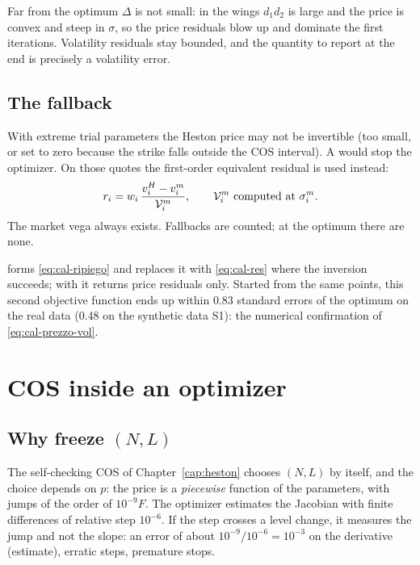 \begin{perche}[title={Why volatilities, then}]
Far from the optimum $\Delta$ is not small: in the wings $d_1d_2$ is large and the price is convex and steep in
$\sigma$, so the price residuals blow up and dominate the first iterations. Volatility residuals stay bounded, and the
quantity to report at the end is precisely a volatility error.
\end{perche}

\subsection{The fallback}
With extreme trial parameters the Heston price may not be invertible (too small, or set to zero because the strike
falls outside the COS interval). A  would stop the optimizer. On those quotes the first-order equivalent
residual is used instead:
\begin{equation}\label{eq:cal-ripiego}
r_i=w_i\,\frac{v^H_i-v^m_i}{\mathcal{V}^m_i},\qquad \mathcal{V}^m_i\ \text{computed at } \sigma^m_i .
\end{equation}
The market vega always exists. Fallbacks are counted; at the optimum there are none.

\begin{progetto}
 forms \eqref{eq:cal-ripiego} and replaces it with \eqref{eq:cal-res} where the inversion
succeeds; with  it returns price residuals only. Started from the same points, this second objective
function ends up within 0.83 standard errors of the optimum on the real data (0.48 on the synthetic data S1): the
numerical confirmation of \eqref{eq:cal-prezzo-vol}.
\end{progetto}

\section{COS inside an optimizer}
\subsection{\texorpdfstring{Why freeze $(N,L)$}{Why freeze (N,L)}}
The self-checking COS of Chapter~\ref{cap:heston} chooses $(N,L)$ by itself, and the choice depends on $p$: the price
is a \emph{piecewise} function of the parameters, with jumps of the order of $10^{-9}F$. The optimizer estimates the
Jacobian with finite differences of relative step $10^{-6}$. If the step crosses a level change, it measures the jump
and not the slope: an error of about $10^{-9}/10^{-6}=10^{-3}$ on the derivative (estimate), erratic steps, premature
stops.

